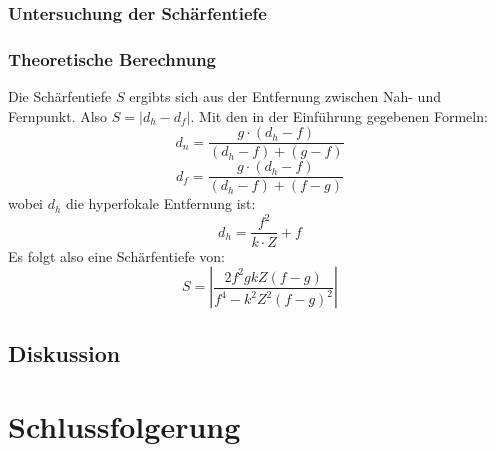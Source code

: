 \documentclass[
	a4paper,
	12pt,
	pagesize,
	ngerman
]{scrartcl}
\begin{document}
	\subsubsection{Untersuchung der Schärfentiefe}
	\subsubsection*{Theoretische Berechnung}
	Die Schärfentiefe $S$ ergibts sich aus der Entfernung zwischen Nah- und Fernpunkt.
	Also $S= |d_h - d_f|$.
	Mit den in der Einführung gegebenen Formeln: %
	\begin{equation}
		d_n = \frac{g\cdot (d_h-f)}{(d_h-f)+(g-f)}
	\end{equation}
	\begin{equation}
		d_f = \frac{g\cdot (d_h - f)}{(d_h-f)+(f-g)}
	\end{equation}
	wobei $d_h$ die hyperfokale Entfernung ist:
	\begin{equation}
		d_h = \frac{f^2}{k\cdot Z} + f
	\end{equation}
	Es folgt also eine Schärfentiefe von:
	\begin{equation}
		S = \left| \frac{2f^2 g k Z (f-g)}{f^4-k^2 Z^2 (f-g)^2} \right|
	\end{equation}

	\subsection{Diskussion}
	
	\section{Schlussfolgerung}
	
	\printbibliography
\end{document}
